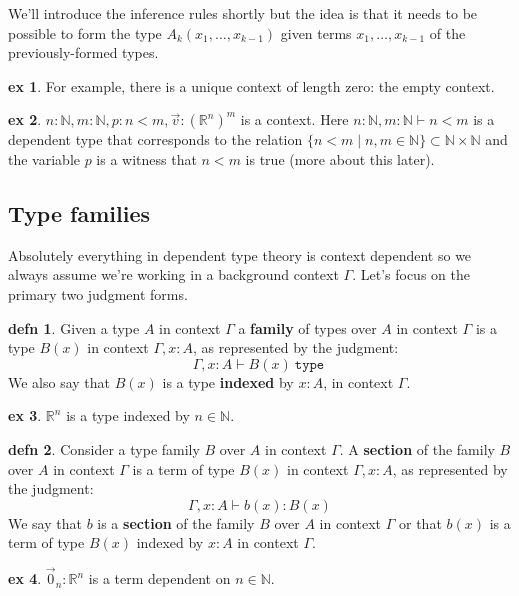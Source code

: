 \documentclass{amsart}
\theoremstyle{theorem}
\theoremstyle{definition}
\newtheorem*{defn}{defn}
\newtheorem*{ex}{ex}
\theoremstyle{remark}
\newcommand{\0}{\mathbbe{0}}
\newcommand{\1}{\mathbbe{1}}
\newcommand{\2}{\mathbbe{2}}
\newcommand{\3}{\mathbbe{3}}
\newcommand{\4}{\mathbbe{4}}
\newcommand{\NN}{\mathbb{N}}
\newcommand{\RR}{\mathbb{R}}
\newcommand{\univ}{{~\texttt{type}~}}
\begin{document}
We'll introduce the inference rules shortly but the idea is that it needs to be possible to form the type $A_k(x_1,\ldots, x_{k-1})$ given terms $x_1, \ldots, x_{k-1}$ of the previously-formed types. 

\begin{ex} For example, there is a unique context of length zero: the empty context.
\end{ex}

\begin{ex} $n : \NN, m : \NN, p : n < m, \vec{v} : (\RR^n)^m$ is a context. Here $n : \NN, m : \NN \vdash n < m$ is a dependent type that corresponds to the relation $\{ n < m \mid n, m \in \NN\} \subset \NN \times \NN$ and the variable $p$ is a witness that $n < m$ is true (more about this later). 
\end{ex}

\subsection*{Type families}

Absolutely everything in dependent type theory is context dependent so we always assume we're working in a background context $\Gamma$. Let's focus on the primary two judgment forms.

\begin{defn} Given a type $A$ in context $\Gamma$ a \textbf{family} of types over $A$ in context $\Gamma$ is a type $B(x)$ in context $\Gamma, x : A$, as represented by the judgment:
\[ \Gamma, x : A \vdash B(x) \univ\]
We also say that $B(x)$ is a type \textbf{indexed} by $x : A$, in context $\Gamma$.
\end{defn}

\begin{ex}  $\RR^n$ is a type indexed by $n \in \NN$.
\end{ex}

\begin{defn} Consider a type family $B$ over $A$ in context $\Gamma$. A \textbf{section} of the family $B$ over $A$ in context $\Gamma$ is a term of type $B(x)$ in context $\Gamma, x : A$, as represented by the judgment:
\[ \Gamma, x : A \vdash b(x) : B(x) \]
We say that $b$ is a \textbf{section} of the family $B$ over $A$ in context $\Gamma$ or that $b(x)$ is a term of type $B(x)$ indexed by $x : A$ in context $\Gamma$.
\end{defn}

\begin{ex} $\vec{0}_n : \RR^n$ is a term dependent on $n \in \NN$.
\end{ex}
\end{document}
